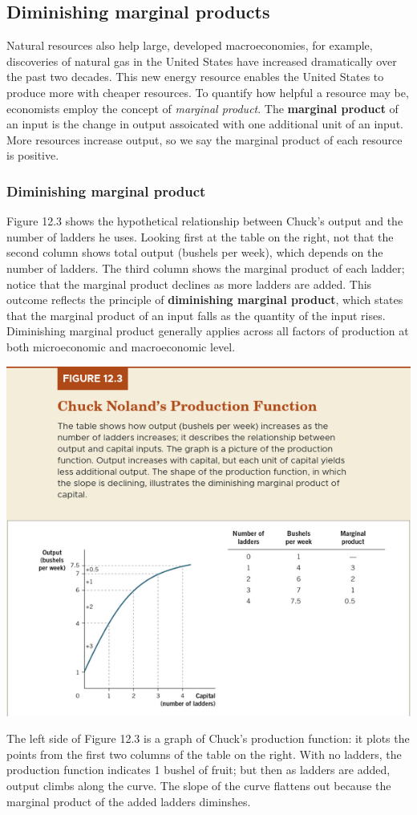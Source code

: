 \documentclass[11pt]{article} %
\begin{document}
\subsection*{Diminishing marginal products}
Natural resources also help large, developed macroeconomies, for example, discoveries of natural gas in the United States have increased dramatically over the past two decades. This new energy resource enables the United States to produce more with cheaper resources. To quantify how helpful a resource may be, economists employ the concept of \textit{marginal product}. The \textbf{marginal product} of an input is the change in output assoicated with one additional unit of an input. More resources increase output, so we say the marginal product of each resource is positive.
\subsubsection*{Diminishing marginal product}
Figure 12.3 shows the hypothetical relationship between Chuck's output and the number of ladders he uses. Looking first at the table on the right, not that the second column shows total output (bushels per week), which depends on the number of ladders. The third column shows the marginal product of each ladder; notice that the marginal product declines as more ladders are added. This outcome reflects the principle of \textbf{diminishing marginal product}, which states that the marginal product of an input falls as the quantity of the input rises. Diminishing marginal product generally applies across all factors of production at both microeconomic and macroeconomic level.
\begin{center}
\includegraphics[scale=0.35]{Images/Figure 12.3.png}
\end{center}
The left side of Figure 12.3 is a graph of Chuck's production function: it plots the points from the first two columns of the table on the right. With no ladders, the production function indicates 1 bushel of fruit; but then as ladders are added, output climbs along the curve. The slope of the curve flattens out because the marginal product of the added ladders diminshes.
\end{document}
